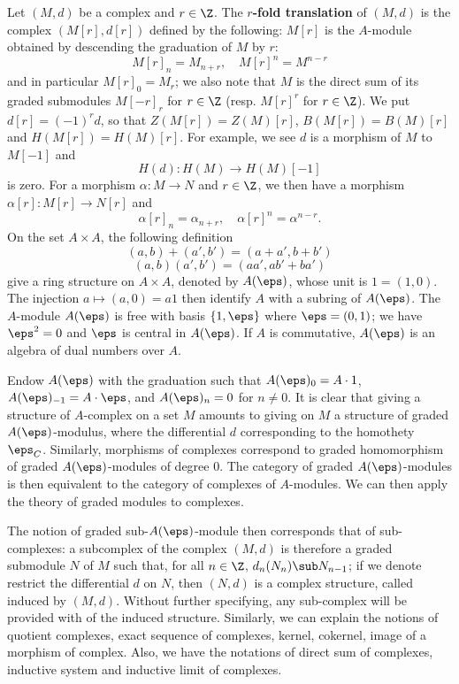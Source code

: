 Let $(M,d)$ be a complex and $r\in\Z$. The \textbf{$r$-fold translation} of $(M,d)$ is the complex $(M[r],d[r])$ defined by the following: $M[r]$ is the $A$-module obtained by descending the graduation of $M$ by $r$:
\[M[r]_n=M_{n+r},\quad M[r]^n=M^{n-r}\]
and in particular $M[r]_0=M_r$; we also note that $M$ is the direct sum of its graded submodules $M[-r]_r$ for $r\in\Z$ (resp. $M[r]^r$ for $r\in\Z$). We put $d[r]=(-1)^rd$, so that $Z(M[r])=Z(M)[r]$, $B(M[r])=B(M)[r]$ and $H(M[r])=H(M)[r]$. For example, we see $d$ is a morphism of $M$ to $M[-1]$ and
\[H(d):H(M)\to H(M)[-1]\]
is zero. For a morphism $\alpha:M\to N$ and $r\in\Z$, we then have a morphism $\alpha[r]:M[r]\to N[r]$ and
\[\alpha[r]_n=\alpha_{n+r},\quad \alpha[r]^n=\alpha^{n-r}.\]
On the set $A\times A$, the following definition
\[(a,b)+(a',b')=(a+a',b+b')\]
\[(a,b)(a',b')=(aa',ab'+ba')\]
give a ring structure on $A\times A$, denoted by $A(\eps)$, whose unit is $1=(1,0)$. The injection $a\mapsto(a,0)=a1$ then identify $A$ with a subring of $A(\eps)$. The $A$-module $A(\eps)$ is free with basis $\{1,\eps\}$ where $\eps=(0,1)$; we have $\eps^2=0$ and $\eps$ is central in $A(\eps)$. If $A$ is commutative, $A(\eps)$ is an algebra of dual numbers over $A$.\par
Endow $A(\eps)$ with the graduation such that $A(\eps)_0=A\cdot 1$, $A(\eps)_{-1}=A\cdot\eps$, and $A(\eps)_n=0$ for $n\neq 0$. It is clear that giving a structure of $A$-complex on a set $M$ amounts to giving on $M$ a structure of graded $A(\eps)$-modulus, where the differential $d$ corresponding to the homothety $\eps_C$. Similarly, morphisms of complexes correspond to graded homomorphism of graded $A(\eps)$-modules of degree $0$. The category of graded $A(\eps)$-modules is then equivalent to the category of complexes of $A$-modules. We can then apply the theory of graded modules to complexes.\par
The notion of graded sub-$A(\eps)$-module then corresponds that of sub-complexes: a subcomplex of the complex $(M,d)$ is therefore a graded submodule $N$ of $M$ such that, for all $n\in\Z$, $d_n(N_n)\sub N_{n-1}$; if we denote restrict the differential $d$ on $N$, then $(N,d)$ is a complex structure, called induced by $(M,d)$. Without further specifying, any sub-complex will be provided with of the induced structure. Similarly, we can explain the notions of quotient complexes, exact sequence of complexes, kernel, cokernel, image of a morphism of complex. Also, we have the notations of direct sum of complexes, inductive system and inductive limit of complexes.\par

